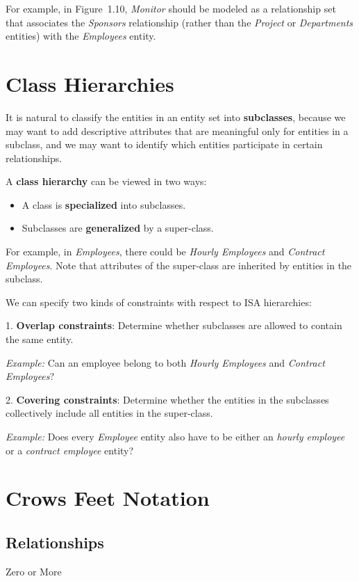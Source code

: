 For example, in Figure~1.10, \emph{Monitor} should be modeled as a relationship set that associates the \emph{Sponsors} relationship (rather than the \emph{Project} or \emph{Departments} entities) with the \emph{Employees} entity.

\section{Class Hierarchies}
It is natural to classify the entities in an entity set into \textbf{subclasses}, because we may want to add descriptive attributes that are meaningful only for entities in a subclass, and we may want to identify which entities participate in certain relationships.  

A \textbf{class hierarchy} can be viewed in two ways:  
\begin{itemize}
  \item A class is \textbf{specialized} into subclasses.  
  \item Subclasses are \textbf{generalized} by a super-class.  
\end{itemize}

For example, in \emph{Employees}, there could be \emph{Hourly Employees} and \emph{Contract Employees}. Note that attributes of the super-class are inherited by entities in the subclass.  

We can specify two kinds of constraints with respect to ISA hierarchies:

1. \textbf{Overlap constraints}: Determine whether subclasses are allowed to contain the same entity.  

\emph{Example:} Can an employee belong to both \emph{Hourly Employees} and \emph{Contract Employees}?
  
2. \textbf{Covering constraints}: Determine whether the entities in the subclasses collectively include all entities in the super-class.  

\emph{Example:} Does every \emph{Employee} entity also have to be either an \emph{hourly employee} or a \emph{contract employee} entity?

\section{Crows Feet Notation}
\subsection{Relationships}
\noindent
{}
\hspace{0.5cm}
\parbox[t]{11cm}{Zero or More}

